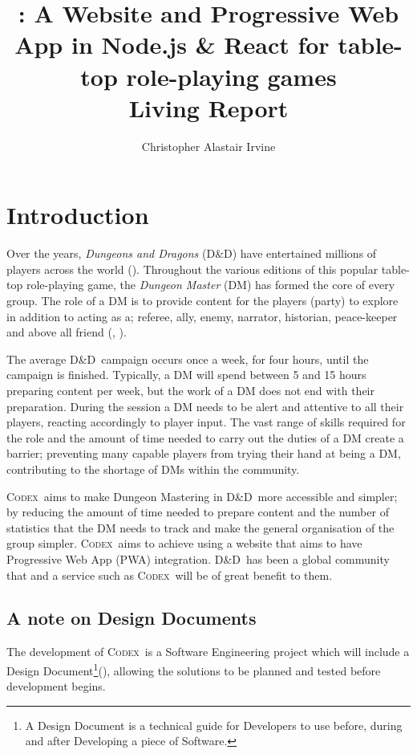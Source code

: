 \documentclass[review]{cmpreport}
\title{\Codex: A Website and Progressive Web App in Node.js \& React for table-top role-playing games \\ Living Report}
\author{Christopher Alastair Irvine}
\newcommand{\dnd}{D\&D}
\newcommand{\Codex}{\textsc{Codex}}
\begin{document}
	\section{Introduction} \label{intro}
	Over the years, \emph{Dungeons and Dragons} (\dnd) have entertained millions of players across the world (\cite{DnDOriginal}). Throughout the various editions of this popular table-top role-playing game, the \emph{Dungeon Master} (DM) has formed the core of every group. The role of a DM is to provide content for the players (party) to explore in addition to acting as a; referee, ally, enemy, narrator, historian, peace-keeper and above all friend (\cite{DnDPeople}, \cite{DungeonMaster}). 
	
	The average \dnd \ campaign occurs once a week, for four hours, until the campaign is finished. Typically, a DM will spend between 5 and 15 hours preparing content per week, but the work of a DM does not end with their preparation. During the session a DM needs to be alert and attentive to all their players, reacting accordingly to player input. The vast range of skills required for the role and the amount of time needed to carry out the duties of a DM create a  barrier; preventing many capable players from trying their hand at being a DM, contributing to the shortage of DMs within the community.
			
	\Codex \ aims to make Dungeon Mastering in \dnd \ more accessible and simpler; by reducing the amount of time needed to prepare content and the number of statistics that the DM needs to track and make the general organisation of the group simpler. \Codex \ aims to achieve using a website that aims to have Progressive Web App (PWA) integration. \dnd \ has been a global community that and a service such as \Codex \ will be of great benefit to them. 
	
	\subsection{A note on Design Documents}
	The development of \Codex \ is a Software Engineering project which will include a Design Document\footnote{A Design Document is a technical guide for Developers to use before, during and after Developing a piece of Software.}(\cite{DesignDocExample}), allowing the solutions to be planned and tested before development begins.
	
\end{document}
